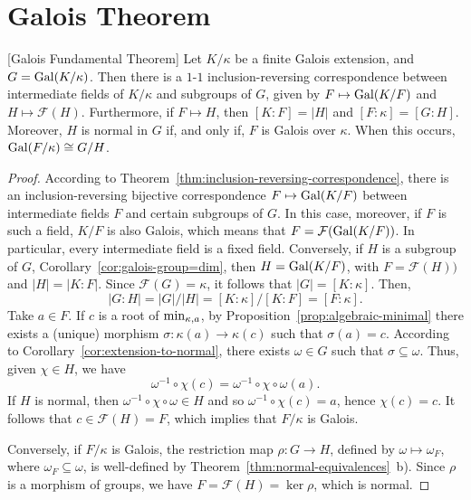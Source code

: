 \section{Galois Theorem}

\begin{thm}\label{thm:galois-fundamental-thm}
    {\rm[Galois Fundamental Theorem]}
    Let\/ $K/\kappa$ be a finite Galois extension, and\/ $G = \operatorname{Gal}(K/\kappa)$. Then there is a\/ $1$-$1$ inclusion-reversing correspondence between intermediate fields of\/ $K / \kappa$ and subgroups of\/ $G$, given by\/ $F \mapsto \operatorname{Gal}(K/F)$ and\/ $H \mapsto \mathcal F(H)$. Furthermore, if\/ $F \mapsto H$, then\/ $[K: F] = |H|$ and\/ $[F : \kappa] = [G: H]$. Moreover, $H$ is normal in\/ $G$ if, and only if, $F$ is Galois over\/ $\kappa$. When this occurs, $\operatorname{Gal}( F / \kappa) \cong G / H$.
\end{thm}

\begin{proof}
    According to Theorem~\ref{thm:inclusion-reversing-correspondence}, there is an inclusion-reversing bijective correspondence $F\mapsto\operatorname{Gal}(K/F)$ between intermediate fields $F$ and certain subgroups of $G$. In this case, moreover, if $F$ is such a field, $K/F$ is also Galois, which means that $F=\mathcal F(\operatorname{Gal}(K/F))$. In particular, every intermediate field is a fixed field. Conversely, if $H$ is a subgroup of $G$, Corollary~\ref{cor:galois-group=dim}, then $H=\operatorname{Gal}(K/F)$, with $F=\mathcal F(H))$ and $|H|=|K:F|$. Since $\mathcal F(G)=\kappa$, it follows that $|G|=[K:\kappa]$. Then,
    $$
        |G:H| = |G|/|H|=[K:\kappa]/[K:F]=[F:\kappa].
    $$
    Take $a\in F$. If $c$ is a root of $\operatorname{min}_{\kappa,a}$, by Proposition~\ref{prop:algebraic-minimal} there exists a (unique) morphism $\sigma\colon\kappa(a)\to\kappa(c)$ such that $\sigma(a)=c$. According to Corollary~\ref{cor:extension-to-normal}, there exists $\omega\in G$ such that $\sigma\subseteq\omega$. Thus, given $\chi\in H$, we have
    $$
        \omega^{-1}\circ\chi(c)=\omega^{-1}\circ\chi\circ\omega(a).
    $$
    If $H$ is normal, then $\omega^{-1}\circ\chi\circ\omega\in H$ and so $\omega^{-1}\circ\chi(c)=a$, hence $\chi(c)=c$. It follows that $c\in\mathcal F(H)=F$, which implies that $F/\kappa$ is Galois.

    Conversely, if $F/\kappa$ is Galois, the restriction map $\rho\colon G\to H$, defined by $\omega\mapsto\omega_F$, where $\omega_F\subseteq\omega$, is well-defined by Theorem~\ref{thm:normal-equivalences}~b). Since $\rho$ is a morphism of groups, we have $F=\mathcal F(H)=\ker\rho$, which is normal.
    
\end{proof}

